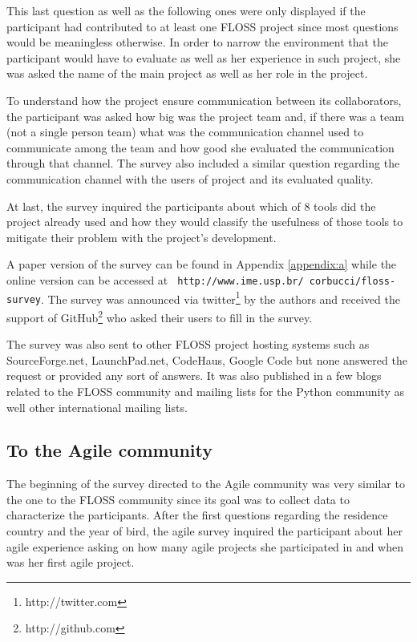 \documentclass[lnbip]{svmultln}
\begin{document}
This last question as well as the following ones were only displayed
if the participant had contributed to at least one FLOSS project since
most questions would be meaningless otherwise. In order to narrow the
environment that the participant would have to evaluate as well as her
experience in such project, she was asked the name of the main project
as well as her role in the project.

To understand how the project ensure communication between its
collaborators, the participant was asked how big was the project team
and, if there was a team (not a single person team) what was the
communication channel used to communicate among the team and how good
she evaluated the communication through that channel.  The survey also
included a similar question regarding the communication channel with
the users of project and its evaluated quality.

At last, the survey inquired the participants about which of 8 tools
did the project already used and how they would classify the
usefulness of those tools to mitigate their problem with the project's
development.

A paper version of the survey can be found in Appendix \ref{appendix:a}
while the online version can be accessed at {\tt
  http://www.ime.usp.br/~corbucci/floss-survey}.  The survey was
announced via twitter\footnote{http://twitter.com} by the authors and
received the support of GitHub\footnote{http://github.com} who asked
their users to fill in the survey.

The survey was also sent to other FLOSS project hosting systems such
as SourceForge.net, LaunchPad.net, CodeHaus, Google Code but none
answered the request or provided any sort of answers.  It was also
published in a few blogs related to the FLOSS community and mailing
lists for the Python community as well other international mailing
lists.

\subsection{To the Agile community}
\label{subsec:agile-survey}

The beginning of the survey directed to the Agile community was very
similar to the one to the FLOSS community since its goal was to
collect data to characterize the participants.  After the first
questions regarding the residence country and the year of bird, the
agile survey inquired the participant about her agile experience
asking on how many agile projects she participated in and when was her
first agile project.
\end{document}
